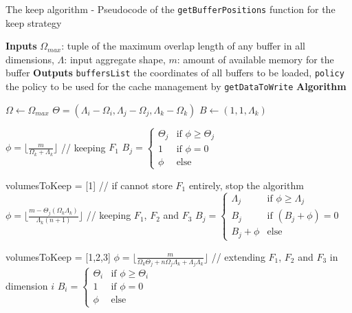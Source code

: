 \documentclass[conference]{IEEEtran}
\begin{document}
\begin{algorithm}
  \caption{The keep algorithm - Pseudocode of the \texttt{getBufferPositions} function for the keep strategy}
  \label{algo:getbuffersposition}
  \begin{algorithmic}[1]
  \STATE \textbf{Inputs}
  \STATE $\Omega_{max}$: tuple of the maximum overlap length
  of any buffer in all dimensions,
  \STATE $\Lambda$: input aggregate shape,
  \STATE $m$: amount of available memory for the buffer
  \STATE
  \STATE \textbf{Outputs}
  \STATE \texttt{buffersList} the coordinates of all buffers to be loaded,
  \STATE \texttt{policy} the policy to be used for the cache management by \texttt{getDataToWrite}
  \STATE
  \STATE \textbf{Algorithm}

  \STATE $\Omega \leftarrow \Omega_{max}$
  \STATE $\Theta = (\Lambda_i - \Omega_i, \Lambda_j - \Omega_j, \Lambda_k - \Omega_k)$
  \STATE $B \leftarrow (1,1,\Lambda_k)$

  \STATE $\phi = \lfloor \frac{m}{\Omega_k + \Lambda_k} \rfloor$ // keeping $F_1$
  \STATE $B_j = \begin{cases}
    \Theta_j & \textrm{if }\phi \geq \Theta_j \\
    1 & \textrm{if }\phi = 0 \\
    \phi & \textrm{else}
  \end{cases}$

    \STATE volumesToKeep = [1] // if cannot store $F_1$ entirely, stop the algorithm
  \ELSE
    \STATE $\phi = \lfloor \frac{m-\Theta_j(\Omega_k\Lambda_k)}{\Lambda_k(n+1)} \rfloor$  // keeping $F_1$, $F_2$ and $F_3$
    \STATE $B_j = \begin{cases}
      \Lambda_j & \textrm{if }\phi \geq \Lambda_j \\
      B_j & \textrm{if }(B_j+\phi) = 0 \\
      B_j + \phi & \textrm{else}
    \end{cases}$

      \STATE volumesToKeep = [1,2,3]
    \ELSE
      \STATE $\phi = \lfloor \frac{m}{\Omega_k\Theta_j + n\Omega_j\Lambda_k + \Lambda_j\Lambda_k} \rfloor$ // extending $F_1$, $F_2$ and $F_3$ in dimension $i$
      \STATE $B_i = \begin{cases}
        \Theta_i & \textrm{if }\phi \geq \Theta_i \\
        1 & \textrm{if }\phi = 0 \\
        \phi & \textrm{else}
      \end{cases}$


\end{algorithmic}
\end{algorithm}
\end{document}
